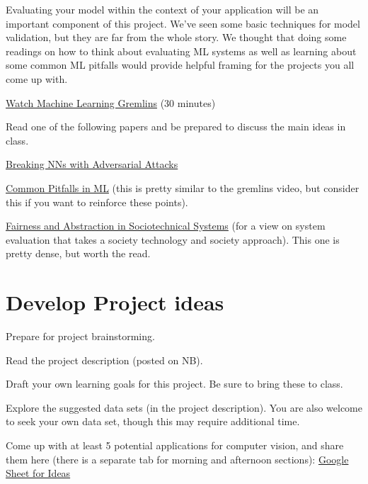 \documentclass[assignment08_Solutions]{subfiles}
\begin{document}
\begin{exercise}[(80 minutes)]
Evaluating your model within the context of your application will be an important component of this project.  We've seen some basic techniques for model validation, but they are far from the whole story.  We thought that doing some readings on how to think about evaluating ML systems as well as learning about some common ML pitfalls would provide helpful framing for the projects you all come up with.

\bes
\item \href{https://www.youtube.com/watch?v=tleeC-KlsKA}{Watch Machine Learning Gremlins} (30 minutes)
\item Read one of the following papers and be prepared to discuss the main ideas in class.
\bi
\item \href{https://towardsdatascience.com/breaking-neural-networks-with-adversarial-attacks-f4290a9a45aa}{Breaking NNs with Adversarial Attacks}
\item \href{http://danielnee.com/2015/01/common-pitfalls-in-machine-learning/}{Common Pitfalls in ML} (this is pretty similar to the gremlins video, but consider this if you want to reinforce these points).
\item \href{https://dl.acm.org/citation.cfm?id=3287598}{Fairness and Abstraction in Sociotechnical Systems} (for a view on system evaluation that takes a society technology and society approach).  This one is pretty dense, but worth the read.
\ei
\ees

\end{exercise}


\section{Develop Project ideas}

\begin{exercise}
Prepare for project brainstorming.
\bes
\item Read the project description (posted on NB). 
\item Draft your own learning goals for this project. Be sure to bring these to class.
\item Explore the suggested data sets (in the project description). You are also welcome to seek your own data set, though this may require additional time.
\item Come up with at least 5 potential applications for computer vision, and share them here (there is a separate tab for morning and afternoon sections): \href{https://docs.google.com/spreadsheets/d/1hgZ_9C6l-iiWTn2BPQGgkwHQiP2nL0pPLvAcC5MrIPo/edit?usp=sharing}{Google Sheet for Ideas} 
\ees 
\end{exercise}
 
\end{document}
